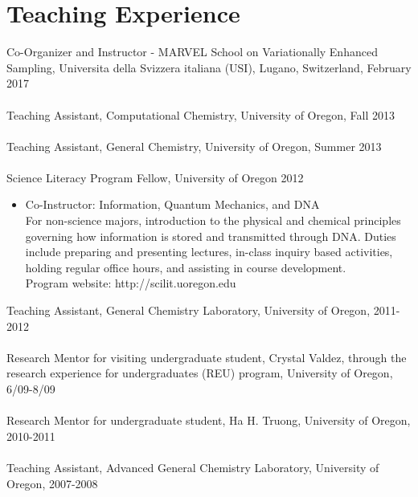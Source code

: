 \documentclass[10pt]{article} %
\begin{document}
\section{Teaching Experience}
Co-Organizer and Instructor - MARVEL School on Variationally Enhanced Sampling, Universita della Svizzera italiana (USI), Lugano, Switzerland, February 2017 \\
\\
Teaching Assistant, Computational Chemistry, University of Oregon, Fall 2013 \\
\\
Teaching Assistant, General Chemistry, University of Oregon, Summer 2013 \\
\\
Science Literacy Program Fellow, University of Oregon 2012 \\
\begin{itemize}
\item Co-Instructor: Information, Quantum Mechanics, and DNA \\
For non-science majors, introduction to the physical and chemical principles governing how information is stored and transmitted through DNA. Duties include preparing and presenting lectures, in-class inquiry based activities, holding regular office hours, and assisting in course development. \\ 
Program website: http://scilit.uoregon.edu
\end{itemize} 
Teaching Assistant, General Chemistry Laboratory, University of Oregon, 2011-2012 \\
\\
Research Mentor for visiting undergraduate student, Crystal Valdez, through the  research experience for undergraduates (REU) program, University of Oregon, 6/09-8/09 \\
\\
Research Mentor for undergraduate student, Ha H. Truong, University of Oregon, 2010-2011 \\
\\
Teaching Assistant, Advanced General Chemistry Laboratory, University of Oregon, 2007-2008 \\
\end{document}
